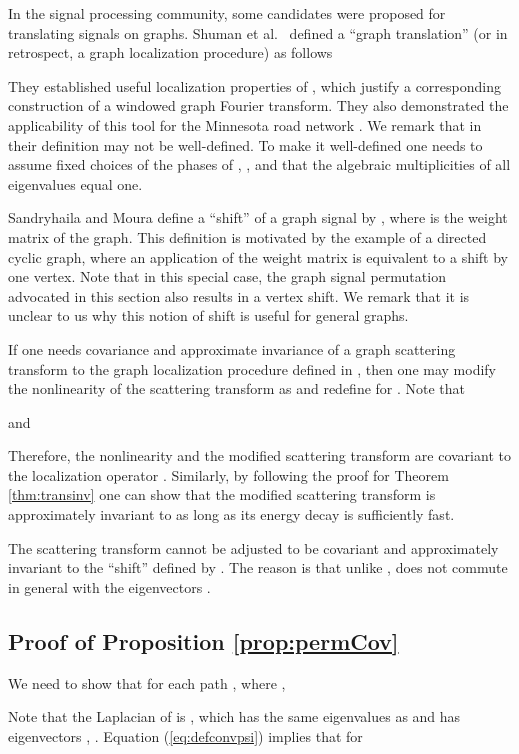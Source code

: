 \documentclass{article}
\begin{document}
In the signal processing community, {some} candidates were proposed for translating signals on graphs. Shuman et al.~\cite{ShuRV16} {defined a ``graph translation'' (or in retrospect, a graph localization procedure) as follows} 

{They established useful localization properties of , which justify a corresponding construction of a windowed graph Fourier transform. They also demonstrated the applicability of this tool for the Minnesota road network \cite[Figure 7]{ShuRV16}. 
We remark that in their definition  may not be well-defined. To make it well-defined one needs to assume fixed choices of the phases of , , and that the algebraic multiplicities of all eigenvalues equal one. }

Sandryhaila and Moura \cite{SanM13} define a ``shift'' of a graph signal  by , where  is the weight matrix of the graph. This definition is motivated by the example of a directed cyclic graph, where an application of the weight matrix is equivalent to a shift by one vertex. Note that in this special case, the graph signal permutation  advocated in this section also results in a vertex shift. {We remark that it is unclear to us why this notion of shift is useful for general graphs.}

If one needs covariance and approximate invariance of a graph scattering transform to the {graph localization procedure} defined in \cite{ShuRV16}, then one may modify the nonlinearity of the scattering transform as  and redefine  for . Note that

and

Therefore, the nonlinearity  and the modified scattering transform are covariant to the {localization operator} . Similarly, by following the proof for Theorem \ref{thm:transinv} one can show that the modified scattering transform is approximately invariant to {} as long as its energy decay is sufficiently fast.

The scattering transform cannot be adjusted to be covariant and approximately invariant to the ``shift'' defined by . The reason is that unlike ,  does not commute in general with the eigenvectors . 



\subsection{Proof of Proposition \ref{prop:permCov}}\label{subsec:proofpermcov}
We need to show that for each path , where , 

Note that the Laplacian of  is , which has the same eigenvalues as  and has eigenvectors , . Equation (\ref{eq:defconvpsi}) implies that for 
\end{document}
